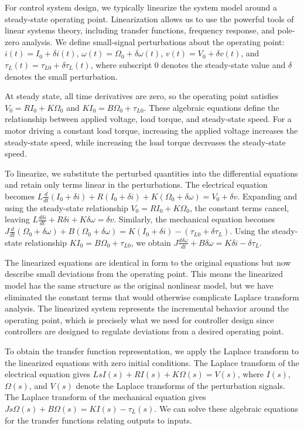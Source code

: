 For control system design, we typically linearize the system model around a steady-state operating point. Linearization allows us to use the powerful tools of linear systems theory, including transfer functions, frequency response, and pole-zero analysis. We define small-signal perturbations about the operating point: $i(t) = I_0 + \delta i(t)$, $\omega(t) = \Omega_0 + \delta\omega(t)$, $v(t) = V_0 + \delta v(t)$, and $\tau_L(t) = \tau_{L0} + \delta\tau_L(t)$, where subscript 0 denotes the steady-state value and $\delta$ denotes the small perturbation.

At steady state, all time derivatives are zero, so the operating point satisfies $V_0 = R I_0 + K \Omega_0$ and $K I_0 = B \Omega_0 + \tau_{L0}$. These algebraic equations define the relationship between applied voltage, load torque, and steady-state speed. For a motor driving a constant load torque, increasing the applied voltage increases the steady-state speed, while increasing the load torque decreases the steady-state speed.

To linearize, we substitute the perturbed quantities into the differential equations and retain only terms linear in the perturbations. The electrical equation becomes $L \frac{d}{dt}(I_0 + \delta i) + R(I_0 + \delta i) + K(\Omega_0 + \delta\omega) = V_0 + \delta v$. Expanding and using the steady-state relationship $V_0 = R I_0 + K \Omega_0$, the constant terms cancel, leaving $L \frac{d\delta i}{dt} + R \delta i + K \delta\omega = \delta v$. Similarly, the mechanical equation becomes $J \frac{d}{dt}(\Omega_0 + \delta\omega) + B(\Omega_0 + \delta\omega) = K(I_0 + \delta i) - (\tau_{L0} + \delta\tau_L)$. Using the steady-state relationship $K I_0 = B \Omega_0 + \tau_{L0}$, we obtain $J \frac{d\delta\omega}{dt} + B \delta\omega = K \delta i - \delta\tau_L$.

The linearized equations are identical in form to the original equations but now describe small deviations from the operating point. This means the linearized model has the same structure as the original nonlinear model, but we have eliminated the constant terms that would otherwise complicate Laplace transform analysis. The linearized system represents the incremental behavior around the operating point, which is precisely what we need for controller design since controllers are designed to regulate deviations from a desired operating point.

To obtain the transfer function representation, we apply the Laplace transform to the linearized equations with zero initial conditions. The Laplace transform of the electrical equation gives $L s I(s) + R I(s) + K \Omega(s) = V(s)$, where $I(s)$, $\Omega(s)$, and $V(s)$ denote the Laplace transforms of the perturbation signals. The Laplace transform of the mechanical equation gives $J s \Omega(s) + B \Omega(s) = K I(s) - \tau_L(s)$. We can solve these algebraic equations for the transfer functions relating outputs to inputs.


